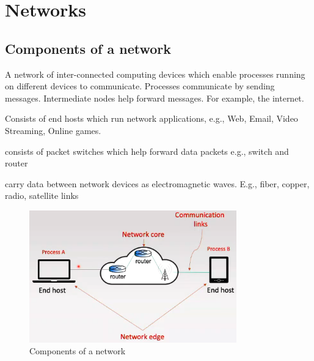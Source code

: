 \documentclass[a4paper]{article}
\theoremstyle{plain}
\theoremstyle{definition}
\newtheorem{defn}{Definition}[section]
\theoremstyle{remark}
\begin{document}
\section{Networks}
\subsection{Components of a network}

	\begin{tcolorbox}[colback=black!3!white,colframe=black!60!white,title=\begin{defn}Network \label{Network}\end{defn}]
	A network of inter-connected computing devices which enable processes running on different devices to communicate. Processes communicate by sending messages. Intermediate nodes help forward messages. For example, the internet.
	\end{tcolorbox}
\begin{tcolorbox}[colback=black!3!white,colframe=black!60!white,title=\begin{defn}Network Edge \label{Network Edge}\end{defn}]
Consists of end hosts which run network applications, e.g., Web, Email, Video Streaming, Online games.
\end{tcolorbox}
\begin{tcolorbox}[colback=black!3!white,colframe=black!60!white,title=\begin{defn}Network core \label{Network core}\end{defn}]
consists of packet switches which help forward data packets e.g., switch and router
\end{tcolorbox}
\begin{tcolorbox}[colback=black!3!white,colframe=black!60!white,title=\begin{defn}Communication links \label{Communication links}\end{defn}]
carry data between network devices as electromagnetic waves. E.g., fiber, copper, radio, satellite links
\end{tcolorbox}
\begin{figure}[H]
	\centering
	\includegraphics[width=0.8\textwidth]{sixteen.png}
	\caption{Components of a network}
	\label{fig:sixteen-png}
\end{figure}
\end{document}

